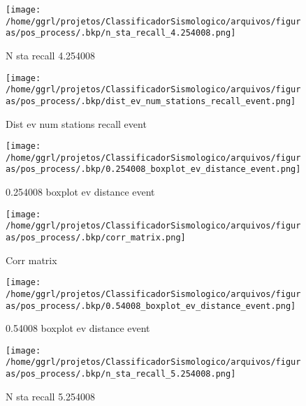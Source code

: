                     \begin{figure}[H]
                        \centering
                        \texttt{[image: /home/ggrl/projetos/ClassificadorSismologico/arquivos/figuras/pos\_process/.bkp/n\_sta\_recall\_4.254008.png]}
                        \caption{N sta recall 4.254008}
                        \label{fig:n_sta_recall_4.254008}
                    \end{figure}
                

                    \begin{figure}[H]
                        \centering
                        \texttt{[image: /home/ggrl/projetos/ClassificadorSismologico/arquivos/figuras/pos\_process/.bkp/dist\_ev\_num\_stations\_recall\_event.png]}
                        \caption{Dist ev num stations recall event}
                        \label{fig:dist_ev_num_stations_recall_event}
                    \end{figure}
                

                    \begin{figure}[H]
                        \centering
                        \texttt{[image: /home/ggrl/projetos/ClassificadorSismologico/arquivos/figuras/pos\_process/.bkp/0.254008\_boxplot\_ev\_distance\_event.png]}
                        \caption{0.254008 boxplot ev distance event}
                        \label{fig:0.254008_boxplot_ev_distance_event}
                    \end{figure}
                

                    \begin{figure}[H]
                        \centering
                        \texttt{[image: /home/ggrl/projetos/ClassificadorSismologico/arquivos/figuras/pos\_process/.bkp/corr\_matrix.png]}
                        \caption{Corr matrix}
                        \label{fig:corr_matrix}
                    \end{figure}
                

                    \begin{figure}[H]
                        \centering
                        \texttt{[image: /home/ggrl/projetos/ClassificadorSismologico/arquivos/figuras/pos\_process/.bkp/0.54008\_boxplot\_ev\_distance\_event.png]}
                        \caption{0.54008 boxplot ev distance event}
                        \label{fig:0.54008_boxplot_ev_distance_event}
                    \end{figure}
                

                    \begin{figure}[H]
                        \centering
                        \texttt{[image: /home/ggrl/projetos/ClassificadorSismologico/arquivos/figuras/pos\_process/.bkp/n\_sta\_recall\_5.254008.png]}
                        \caption{N sta recall 5.254008}
                        \label{fig:n_sta_recall_5.254008}
                    \end{figure}
                
